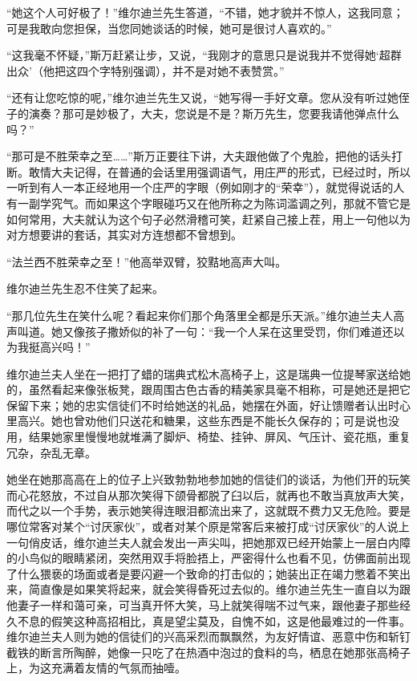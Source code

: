 \par “她这个人可好极了！”维尔迪兰先生答道，“不错，她才貌并不惊人，这我同意；可是我敢向您担保，当您同她谈话的时候，她可是很讨人喜欢的。”
\par “这我毫不怀疑，”斯万赶紧让步，又说，“我刚才的意思只是说我并不觉得她‘超群出众’（他把这四个字特别强调），并不是对她不表赞赏。”
\par “还有让您吃惊的呢，”维尔迪兰先生又说，“她写得一手好文章。您从没有听过她侄子的演奏？那可是妙极了，大夫，您说是不是？斯万先生，您要我请他弹点什么吗？”
\par “那可是不胜荣幸之至……”斯万正要往下讲，大夫跟他做了个鬼脸，把他的话头打断。敢情大夫记得，在普通的会话里用强调语气，用庄严的形式，已经过时，所以一听到有人一本正经地用一个庄严的字眼（例如刚才的“荣幸”），就觉得说话的人有一副学究气。而如果这个字眼碰巧又在他所称之为陈词滥调之列，那就不管它是如何常用，大夫就认为这个句子必然滑稽可笑，赶紧自己接上茬，用上一句他以为对方想要讲的套话，其实对方连想都不曾想到。
\par “法兰西不胜荣幸之至！”他高举双臂，狡黠地高声大叫。
\par 维尔迪兰先生忍不住笑了起来。
\par “那几位先生在笑什么呢？看起来你们那个角落里全都是乐天派。”维尔迪兰夫人高声叫道。她又像孩子撒娇似的补了一句：“我一个人呆在这里受罚，你们难道还以为我挺高兴吗！”
\par 维尔迪兰夫人坐在一把打了蜡的瑞典式松木高椅子上，这是瑞典一位提琴家送给她的，虽然看起来像张板凳，跟周围古色古香的精美家具毫不相称，可是她还是把它保留下来；她的忠实信徒们不时给她送的礼品，她摆在外面，好让馈赠者认出时心里高兴。她也曾劝他们只送花和糖果，这些东西是不能长久保存的；可是说也没用，结果她家里慢慢地就堆满了脚炉、椅垫、挂钟、屏风、气压计、瓷花瓶，重复冗杂，杂乱无章。
\par 她坐在她那高高在上的位子上兴致勃勃地参加她的信徒们的谈话，为他们开的玩笑而心花怒放，不过自从那次笑得下颌骨都脱了臼以后，就再也不敢当真放声大笑，而代之以一个手势，表示她笑得连眼泪都流出来了，这就既不费力又无危险。要是哪位常客对某个“讨厌家伙”，或者对某个原是常客后来被打成“讨厌家伙”的人说上一句俏皮话，维尔迪兰夫人就会发出一声尖叫，把她那双已经开始蒙上一层白内障的小鸟似的眼睛紧闭，突然用双手将脸捂上，严密得什么也看不见，仿佛面前出现了什么猥亵的场面或者是要闪避一个致命的打击似的；她装出正在竭力憋着不笑出来，简直像是如果笑将起来，就会笑得昏死过去似的。维尔迪兰先生一直自以为跟他妻子一样和蔼可亲，可当真开怀大笑，马上就笑得喘不过气来，跟他妻子那些经久不息的假笑这种高招相比，真是望尘莫及，自愧不如，这是他最难过的一件事。维尔迪兰夫人则为她的信徒们的兴高采烈而飘飘然，为友好情谊、恶意中伤和斩钉截铁的断言所陶醉，她像一只吃了在热酒中泡过的食料的鸟，栖息在她那张高椅子上，为这充满着友情的气氛而抽噎。
